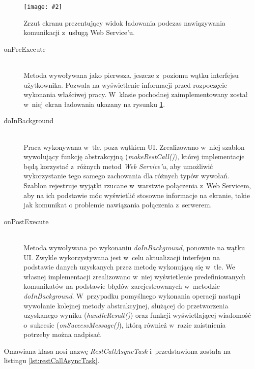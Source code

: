 \documentclass[11pt]{aghdpl}
\newcommand{\customWidthPicture}[3]{
\begin{figure}[h!]
	\centering
		\texttt{[image: \#2]}
	\caption{#3}
	\label{fig:#2}
\end{figure}
}
\begin{document}
\customWidthPicture{.3}{mobileLadowanie}{Zrzut ekranu prezentujący widok ładowania podczas nawiązywania komunikacji z~usługą Web Service'u.}

\begin{description}
	\item[onPreExecute] \hfill \\
	Metoda wywoływana jako pierwsza, jeszcze z~poziomu wątku interfejsu użytkownika. Pozwala na wyświetlenie informacji przed rozpoczęcie wykonania właściwej pracy. W~klasie pochodnej zaimplementowany został w~niej ekran ładowania ukazany na rysunku \ref{fig:mobileLadowanie}.
	\item[doInBackground] \hfill \\
	Praca wykonywana w~tle, poza wątkiem UI. Zrealizowano w~niej szablon wywołujący funkcję abstrakcyjną (\emph{makeRestCall()}), której implementacje będą korzystać z~różnych metod \emph{Web Service'u}, aby umożliwić wykorzystanie tego samego zachowania dla różnych typów wywołań. Szablon rejestruje wyjątki rzucane w~warstwie połączenia z~Web Servicem, aby na ich podstawie móc wyświetlić stosowne informacje na ekranie, takie jak komunikat o problemie nawiązania połączenia z~serwerem.
	\item[onPostExecute] \hfill \\
	Metoda wywoływana po wykonaniu \emph{doInBackground}, ponownie na wątku UI. Zwykle wykorzystywana jest w~celu aktualizacji interfejsu na podstawie danych uzyskanych przez metodę wykonującą się w~tle. We własnej implementacji zrealizowano w~niej wyświetlenie predefiniowanych komunikatów na podstawie błędów zarejestrowanych w~metodzie \emph{doInBackground}. W~przypadku pomyślnego wykonania operacji nastąpi wywołanie kolejnej metody abstrakcyjnej, służącej do przetworzenia uzyskanego wyniku (\emph{handleResult()}) oraz funkcji wyświetlającej wiadomość o~sukcesie (\emph{onSuccessMessage()}), którą również w~razie zaistnienia potrzeby można nadpisać.
\end{description}

Omawiana klasa nosi nazwę \emph{RestCallAsyncTask} i~przedstawiona została na listingu \ref{lst:restCallAsyncTask}.
\end{document}
